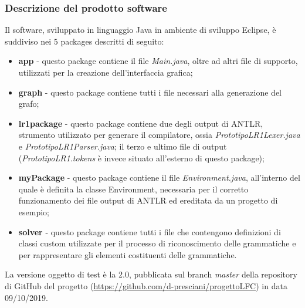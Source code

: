 \documentclass[12pt]{article}
\begin{document}
\subsubsection{Descrizione del prodotto software}
Il software, sviluppato in linguaggio Java in ambiente di sviluppo Eclipse, è suddiviso nei $5$ packages descritti di seguito:
\begin{itemize}
\item \textbf{app} - questo package contiene il file \textit{Main.java}, oltre ad altri file di supporto, utilizzati per la creazione dell'interfaccia grafica;
\item \textbf{graph} - questo package contiene tutti i file necessari alla generazione del grafo;
\item \textbf{lr1package} - questo package contiene due degli output di ANTLR, strumento utilizzato per generare il compilatore, ossia \textit{PrototipoLR1Lexer.java} e \textit{PrototipoLR1Parser.java}; il terzo e ultimo file di output (\textit{PrototipoLR1.tokens} è invece situato all'esterno di questo package);
\item \textbf{myPackage} - questo package contiene il file \textit{Environment.java}, all'interno del quale è definita la classe Environment, necessaria per il corretto funzionamento dei file output di ANTLR ed ereditata da un progetto di esempio;
\item \textbf{solver} - questo package contiene tutti i file che contengono definizioni di classi custom utilizzate per il processo di riconoscimento delle grammatiche e per rappresentare gli elementi costituenti delle grammatiche.
\end{itemize}
La versione oggetto di test è la 2.0, pubblicata sul branch \textit{master} della repository di GitHub del progetto (\url{https://github.com/d-presciani/progettoLFC}) in data 09/10/2019.
\pagebreak
\end{document}

